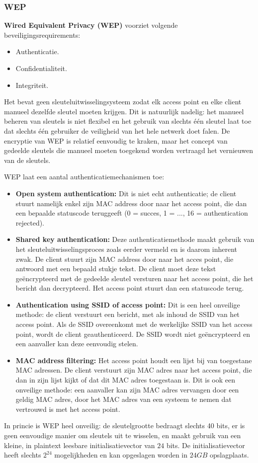 \documentclass{report}
\begin{document}
	\subsubsection{WEP}
	\textbf{Wired Equivalent Privacy (WEP)} voorziet volgende beveiligingsrequirements:
	\begin{itemize}
		\item[\info] Authenticatie.
		\item[\info] Confidentialiteit.
		\item[\info] Integriteit.
	\end{itemize}
	Het bevat geen sleuteluitwisselingsysteem zodat elk access point en elke client manueel dezelfde sleutel moeten krijgen. Dit is natuurlijk nadelig: het manueel beheren van sleutels is niet flexibel en het gebruik van slechts één sleutel laat toe dat slechts één gebruiker de veiligheid van het hele netwerk doet falen. De encryptie van WEP is relatief eenvoudig te kraken, maar het concept van gedeelde sleutels die manueel moeten toegekend worden vertraagd het vernieuwen van de sleutels.

	WEP laat een aantal authenticatiemechanismen toe:
	\begin{itemize}
		\item[\info] \textbf{Open system authentication:} Dit is niet echt authenticatie; de client stuurt namelijk enkel zijn MAC address door naar het access point, die dan een bepaalde statuscode teruggeeft (0 = succes, 1 = ..., 16 = authentication rejected).
		\item[\info] \textbf{Shared key authentication:} Deze authenticatiemethode maakt gebruik van het sleuteluitwisselingsproces zoals eerder vermeld en is daarom inherent zwak. De client stuurt zijn MAC address door naar het acces point, die antwoord met een bepaald stukje tekst. De client moet deze tekst geëncrypteerd met de gedeelde sleutel versturen naar het access point, die het bericht dan decrypteerd. Het access point stuurt dan een statuscode terug.  
		\item[\info] \textbf{Authentication using SSID of access point:} Dit is een heel onveilige methode: de client verstuurt een bericht, met als inhoud de SSID van het access point. Als de SSID overeenkomt met de werkelijke SSID van het access point, wordt de client geauthenticeerd. De SSID wordt niet geëncrypteerd en een aanvaller kan deze eenvoudig stelen. 
		\item[\info] \textbf{MAC address filtering:} Het access point houdt een lijst bij van toegestane MAC adressen. De client verstuurt zijn MAC adres naar het access point, die dan in zijn lijst kijkt of dat dit MAC adres toegestaan is. Dit is ook een onveilige methode: een aanvaller kan zijn MAC adres vervangen door een geldig MAC adres, door het MAC adres van een systeem te nemen dat vertrouwd is met het access point.
	\end{itemize}
	In princie is WEP heel onveilig: de sleutelgrootte bedraagt slechts 40 bits, er is geen eenvoudige manier om sleutels uit te wisselen, en maakt gebruik van een kleine, in plaintext leesbare initialisatievector van $24$ bits. De initialisatievector heeft slechts $2^{24}$ mogelijkheden en kan opgeslagen worden in $24GB$ opslagplaats. 
\end{document}
